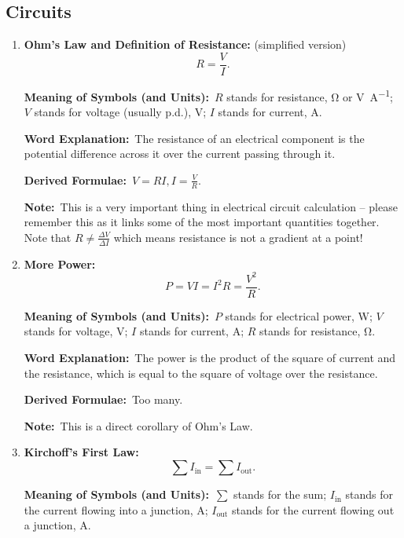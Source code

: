 \documentclass[8pt]{article}
\newcommand{\MeanSymb}{\textbf{Meaning of Symbols (and Units):}\ }
\newcommand{\WordExpl}{\textbf{Word Explanation:}\ }
\newcommand{\DeriForm}{\textbf{Derived Formulae:}\ }
\newcommand{\Note}{\textbf{Note:}\ }
\begin{document}
        \subsection{Circuits}
            \begin{enumerate}
                \item \textbf{Ohm's Law and Definition of Resistance:} (simplified version)
                \[
                    R = \frac{V}{I}.
                \]

                \MeanSymb \(R\) stands for resistance, \unit{\ohm} or \unit{\volt\per\ampere}; \(V\) stands for voltage (usually p.d.), \unit{\volt}; \(I\) stands for current, \unit{\ampere}.

                \WordExpl The resistance of an electrical component is the potential difference across it over the current passing through it.

                \DeriForm \(V = RI, I = \frac{V}{R}\).

                \Note This is a very important thing in electrical circuit calculation -- please remember this as it links some of the most important quantities together. Note that \(R \neq \frac{\Delta V}{\Delta I}\) which means resistance is not a gradient at a point!

                \item \textbf{More Power:}
                \[
                    P = VI = I^2 R = \frac{V^2}{R}.
                \]

                \MeanSymb \(P\) stands for electrical power, \unit{\watt}; \(V\) stands for voltage, \unit{\volt}; \(I\) stands for current, \unit{\ampere}; \(R\) stands for resistance, \unit{\ohm}.

                \WordExpl The power is the product of the square of current and the resistance, which is equal to the square of voltage over the resistance.

                \DeriForm Too many.

                \Note This is a direct corollary of Ohm's Law.

                \item \textbf{Kirchoff's First Law:}
                \[
                    \sum I_{\text{in}} = \sum I_{\text{out}}.
                \]

                \MeanSymb \(\sum\) stands for the sum; \(I_{\text{in}}\) stands for the current flowing into a junction, \unit{\ampere}; \(I_{\text{out}}\) stands for the current flowing out a junction, \unit{\ampere}.


\end{enumerate}
\end{document}
